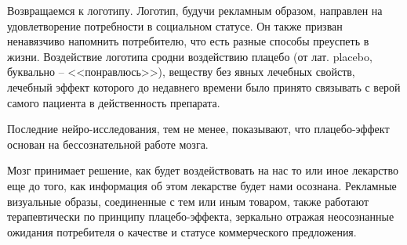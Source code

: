 Возвращаемся к логотипу. Логотип, будучи рекламным образом, направлен на
удовлетворение потребности в социальном статусе. Он также призван ненавязчиво
напомнить потребителю, что есть разные способы преуспеть в жизни. Воздействие
логотипа сродни воздействию плацебо (от лат. placebo, буквально -- <<понравлюсь>>),
веществу без явных лечебных свойств, лечебный эффект которого до недавнего
времени было принято связывать с верой самого пациента в действенность
препарата.

Последние нейро-исследования, тем не менее, показывают, что плацебо-эффект
основан на бессознательной работе
мозга.\autocite{jensen2012nonconscious}

Мозг принимает решение, как будет воздействовать на нас то или иное лекарство
еще до того, как информация об этом лекарстве будет нами осознана. Рекламные
визуальные образы, соединенные с тем или иным товаром, также работают
терапевтически по принципу плацебо-эффекта, зеркально отражая неосознанные
ожидания потребителя о качестве и статусе коммерческого
предложения.\autocite{ariely2009predictably}

